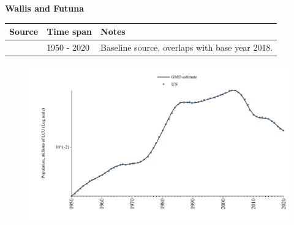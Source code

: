 \documentclass[12pt,a4paper,landscape]{article}
\begin{document}
\begin{adjustbox}{max totalsize={\paperwidth}{\paperheight},center}
\begin{minipage}[t][\textheight][t]{\textwidth}
\vspace*{0.5cm}
{}
\begin{center}
{\Large\bfseries Wallis and Futuna}
\end{center}
\vspace{0.5cm}
\begin{table}[H]
\centering
\small
\begin{tabular}{|l|l|l|}
\hline
\textbf{Source} & \textbf{Time span} & \textbf{Notes} \\
\hline
\rowcolor{white}\cite{UN}& 1950 - 2020 &Baseline source, overlaps with base year 2018.\\
\hline
\end{tabular}
\end{table}
\begin{figure}[H]
\centering
\includegraphics[width=\textwidth,height=0.6\textheight,keepaspectratio]{graphs/WLF_pop.pdf}
\end{figure}
\end{minipage}
\end{adjustbox}
\end{document}
